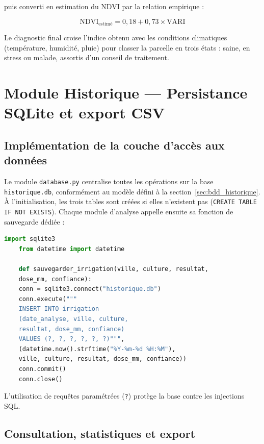 puis converti en estimation du NDVI par la relation empirique :

\begin{equation}
	\text{NDVI}_{\text{estimé}} = 0{,}18 + 0{,}73 \times \text{VARI}
	\label{eq:vari_ndvi}
\end{equation}

Le diagnostic final croise l'indice obtenu avec les conditions
climatiques (température, humidité, pluie) pour classer la
parcelle en trois états : saine, en stress ou malade, assortis
d'un conseil de traitement.

\section{Module Historique --- Persistance SQLite et export CSV}
\label{sec:module_historique}

\subsection{Implémentation de la couche d'accès aux données}

Le module \texttt{database.py} centralise toutes les opérations
sur la base \texttt{historique.db}, conformément au modèle défini
à la section~\ref{sec:bdd_historique}. À l'initialisation, les
trois tables sont créées si elles n'existent pas
(\texttt{CREATE TABLE IF NOT EXISTS}). Chaque module d'analyse
appelle ensuite sa fonction de sauvegarde dédiée :

\begin{lstlisting}[language=Python,
	caption={Sauvegarde d'une analyse d'irrigation dans SQLite},
	label={lst:sqlite}]
	import sqlite3
	from datetime import datetime
	
	def sauvegarder_irrigation(ville, culture, resultat,
	dose_mm, confiance):
	conn = sqlite3.connect("historique.db")
	conn.execute("""
	INSERT INTO irrigation
	(date_analyse, ville, culture,
	resultat, dose_mm, confiance)
	VALUES (?, ?, ?, ?, ?, ?)""",
	(datetime.now().strftime("%Y-%m-%d %H:%M"),
	ville, culture, resultat, dose_mm, confiance))
	conn.commit()
	conn.close()
\end{lstlisting}

L'utilisation de requêtes paramétrées (\texttt{?}) protège la
base contre les injections SQL.

\subsection{Consultation, statistiques et export}


